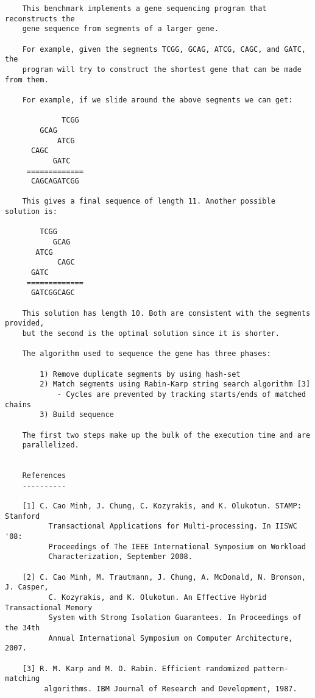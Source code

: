 \documentclass{article}
\begin{document}
\begin{verbatim}
    This benchmark implements a gene sequencing program that reconstructs the 
    gene sequence from segments of a larger gene.

    For example, given the segments TCGG, GCAG, ATCG, CAGC, and GATC, the 
    program will try to construct the shortest gene that can be made from them.

    For example, if we slide around the above segments we can get:

             TCGG
        GCAG
            ATCG
      CAGC
           GATC
     =============
      CAGCAGATCGG

    This gives a final sequence of length 11. Another possible solution is:

        TCGG
           GCAG
       ATCG
            CAGC
      GATC
     =============
      GATCGGCAGC

    This solution has length 10. Both are consistent with the segments provided,
    but the second is the optimal solution since it is shorter.

    The algorithm used to sequence the gene has three phases:

        1) Remove duplicate segments by using hash-set
        2) Match segments using Rabin-Karp string search algorithm [3]
            - Cycles are prevented by tracking starts/ends of matched chains
        3) Build sequence

    The first two steps make up the bulk of the execution time and are 
    parallelized.


    References
    ----------

    [1] C. Cao Minh, J. Chung, C. Kozyrakis, and K. Olukotun. STAMP: Stanford 
          Transactional Applications for Multi-processing. In IISWC '08: 
          Proceedings of The IEEE International Symposium on Workload 
          Characterization, September 2008. 

    [2] C. Cao Minh, M. Trautmann, J. Chung, A. McDonald, N. Bronson, J. Casper,
          C. Kozyrakis, and K. Olukotun. An Effective Hybrid Transactional Memory
          System with Strong Isolation Guarantees. In Proceedings of the 34th 
          Annual International Symposium on Computer Architecture, 2007.

    [3] R. M. Karp and M. O. Rabin. Efficient randomized pattern-matching
         algorithms. IBM Journal of Research and Development, 1987.

\end{verbatim}
\end{document}
